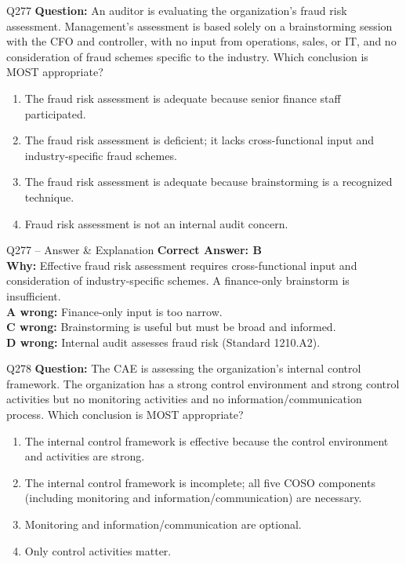 \documentclass[aspectratio=169,10pt]{beamer}
\begin{document}
	\begin{frame}[t]{Q277}
		\small
		\textbf{Question:} An auditor is evaluating the organization's fraud risk assessment. Management's assessment is based solely on a brainstorming session with the CFO and controller, with no input from operations, sales, or IT, and no consideration of fraud schemes specific to the industry. Which conclusion is MOST appropriate?
		\begin{enumerate}[label=\Alph*.,itemsep=1pt,topsep=2pt]
			\item The fraud risk assessment is adequate because senior finance staff participated.
			\item The fraud risk assessment is deficient; it lacks cross-functional input and industry-specific fraud schemes.
			\item The fraud risk assessment is adequate because brainstorming is a recognized technique.
			\item Fraud risk assessment is not an internal audit concern.
		\end{enumerate}
	\end{frame}
	
	\begin{frame}[t]{Q277 -- Answer \& Explanation}
		\small
		\textbf{Correct Answer: B} \\[4pt]
		\textbf{Why:} Effective fraud risk assessment requires cross-functional input and consideration of industry-specific schemes. A finance-only brainstorm is insufficient. \\[4pt]
		\textbf{A wrong:} Finance-only input is too narrow. \\[2pt]
		\textbf{C wrong:} Brainstorming is useful but must be broad and informed. \\[2pt]
		\textbf{D wrong:} Internal audit assesses fraud risk (Standard 1210.A2).
	\end{frame}
	
	\begin{frame}[t]{Q278}
		\small
		\textbf{Question:} The CAE is assessing the organization's internal control framework. The organization has a strong control environment and strong control activities but no monitoring activities and no information/communication process. Which conclusion is MOST appropriate?
		\begin{enumerate}[label=\Alph*.,itemsep=1pt,topsep=2pt]
			\item The internal control framework is effective because the control environment and activities are strong.
			\item The internal control framework is incomplete; all five COSO components (including monitoring and information/communication) are necessary.
			\item Monitoring and information/communication are optional.
			\item Only control activities matter.
		\end{enumerate}
	\end{frame}
	
\end{document}
